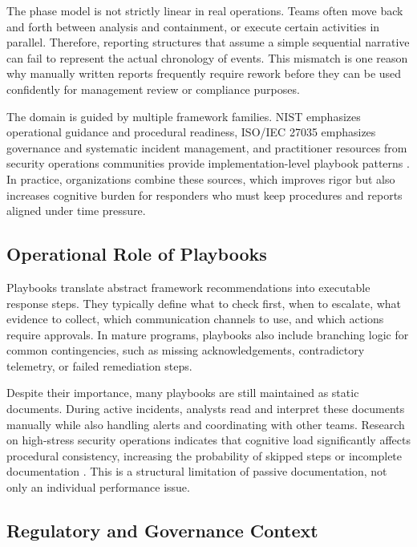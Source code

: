 The phase model is not strictly linear in real operations. Teams often move back and forth between analysis and containment, or execute certain activities in parallel. Therefore, reporting structures that assume a simple sequential narrative can fail to represent the actual chronology of events. This mismatch is one reason why manually written reports frequently require rework before they can be used confidently for management review or compliance purposes.

The domain is guided by multiple framework families. NIST emphasizes operational guidance and procedural readiness, ISO/IEC 27035 emphasizes governance and systematic incident management, and practitioner resources from security operations communities provide implementation-level playbook patterns \cite{nist_800_61,iso_27035,sans_incident_handler}. In practice, organizations combine these sources, which improves rigor but also increases cognitive burden for responders who must keep procedures and reports aligned under time pressure.

\subsection{Operational Role of Playbooks}

Playbooks translate abstract framework recommendations into executable response steps. They typically define what to check first, when to escalate, what evidence to collect, which communication channels to use, and which actions require approvals. In mature programs, playbooks also include branching logic for common contingencies, such as missing acknowledgements, contradictory telemetry, or failed remediation steps.

Despite their importance, many playbooks are still maintained as static documents. During active incidents, analysts read and interpret these documents manually while also handling alerts and coordinating with other teams. Research on high-stress security operations indicates that cognitive load significantly affects procedural consistency, increasing the probability of skipped steps or incomplete documentation \cite{journal_cybersecurity_stress}. This is a structural limitation of passive documentation, not only an individual performance issue.

\subsection{Regulatory and Governance Context}

